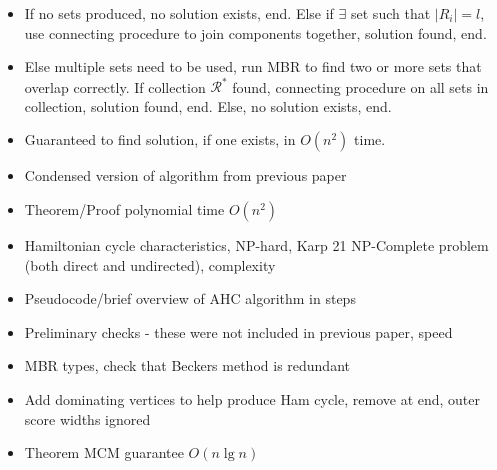 \documentclass{elsarticle}
\begin{document}
\begin{itemize}
	\item If no sets produced, no solution exists, end. Else if $\exists$ set such that $|R_i| = l$, use connecting procedure to join components together, solution found, end.
	\item Else multiple sets need to be used, run MBR to find two or more sets that overlap correctly. If collection $\mathcal{R}^*$ found, connecting procedure on all sets in collection, solution found, end. Else, no solution exists, end.
	\item Guaranteed to find solution, if one exists, in $O(n^2)$ time.
	\item Condensed version of algorithm from previous paper
	\item Theorem/Proof polynomial time $O(n^2)$
	\item Hamiltonian cycle characteristics, NP-hard, Karp 21 NP-Complete problem (both direct and undirected), complexity
	\item Pseudocode/brief overview of AHC algorithm in steps
	\item Preliminary checks - these were not included in previous paper, speed
	\item MBR types, check that Beckers method is redundant
	\item Add dominating vertices to help produce Ham cycle, remove at end, outer score widths ignored
	\item Theorem MCM guarantee $O(n \lg n)$
\end{itemize}
\end{document}
